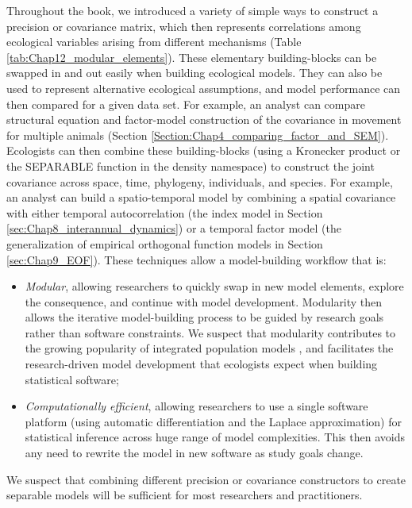 Throughout the book, we introduced a variety of simple ways to construct a precision or covariance matrix, which then represents correlations among ecological variables arising from different mechanisms (Table \ref{tab:Chap12_modular_elements}). These elementary building-blocks can be swapped in and out easily when building ecological models. They can also be used to represent alternative ecological assumptions, and model performance can then compared for a given data set.  For example, an analyst can compare structural equation and factor-model construction of the covariance in movement for multiple animals (Section \ref{Section:Chap4_comparing_factor_and_SEM}).  Ecologists can then combine these building-blocks (using a Kronecker product or the \colorbox{backblue}{SEPARABLE} function in the \colorbox{backblue}{density} namespace) to construct the joint covariance across space, time, phylogeny, individuals, and species.  For example, an analyst can build a spatio-temporal model by combining a spatial covariance with either temporal autocorrelation (the index model in Section \ref{sec:Chap8_interannual_dynamics}) or a temporal factor model (the generalization of empirical orthogonal function models in Section \ref{sec:Chap9_EOF}).  These techniques allow a model-building workflow that is:

\begin{itemize}
    \item \textit{Modular}, allowing researchers to quickly swap in new model elements, explore the consequence, and continue with model development.  Modularity then allows the iterative model-building process to be guided by research goals rather than software constraints.  We suspect that modularity contributes to the growing popularity of integrated population models \cite{kery_integrated_2021}, and facilitates the research-driven model development that ecologists expect when building statistical software; 

    \item \textit{Computationally efficient}, allowing researchers to use a single software platform (using automatic differentiation and the Laplace approximation) for statistical inference across huge range of model complexities.  This then avoids any need to rewrite the model in new software as study goals change.
\end{itemize}
We suspect that combining different precision or covariance constructors to create separable models will be sufficient for most researchers and practitioners. 

